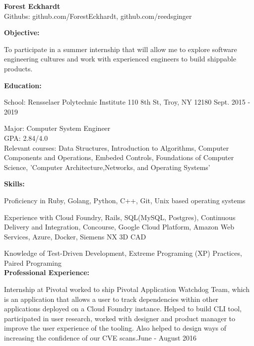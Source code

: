 \documentclass[10pt,a4papaer]{article}
\begin{document}
{\selectfont
\begin{center}	
	{\huge\textbf{Forest Eckhardt}} \\
	Githubs: github.com/ForestEckhardt, github.com/reedsginger \\
\end{center}
{\noindent\textbf{Objective:}}

\setlength{\leftskip}{15pt}

{\noindent To participate in a summer internship that will allow me to explore software engineering cultures and work with experienced engineers to build shippable products.}\\

\setlength{\leftskip}{0pt}


{\noindent\textbf{Education:}}

{ School: Rensselaer Polytechnic Institute 110 8th St, Troy, NY 12180 {\hfill Sept. 2015 - 2019}}

\setlength{\leftskip}{50pt}

{\noindent Major: Computer System Engineer\\
	GPA: 2.84/4.0\\
	Relevant courses: Data Structures, Introduction to Algorithms, Computer Components and Operations, Embeded Controls, Foundations of Computer Science, 'Computer Architecture,Networks, and Operating Systems'}\\

\setlength{\leftskip}{0pt}

{\noindent\textbf{Skills:}}

Proficiency in Ruby, Golang, Python, C++, Git, Unix based operating systems\\

\setlength{\leftskip}{15pt}

{\noindent Experience with Cloud Foundry, Rails, SQL(MySQL, Postgres), Continuous Delivery and Integration, Concourse, Google Cloud Platform, Amazon Web Services, Azure, Docker, Siemens NX 3D CAD}\\

\setlength{\leftskip}{0pt}

Knowledge of Test-Driven Development, Extreme Programing (XP) Practices, Paired Programing\\

{\noindent\textbf{Professional Experience:}}

\setlength{\leftskip}{15pt}

{\noindent Internship at Pivotal worked to ship Pivotal Application Watchdog Team, which is an application that allows a user to track dependencies within other applications deployed on a Cloud Foundry instance. Helped to build CLI tool, participated in user research, worked with designer and product manager to improve the user experience of the tooling. Also helped to design ways of increasing the confidence of our CVE scans.}{\hfill June - August 2016}\\

}
\end{document}
